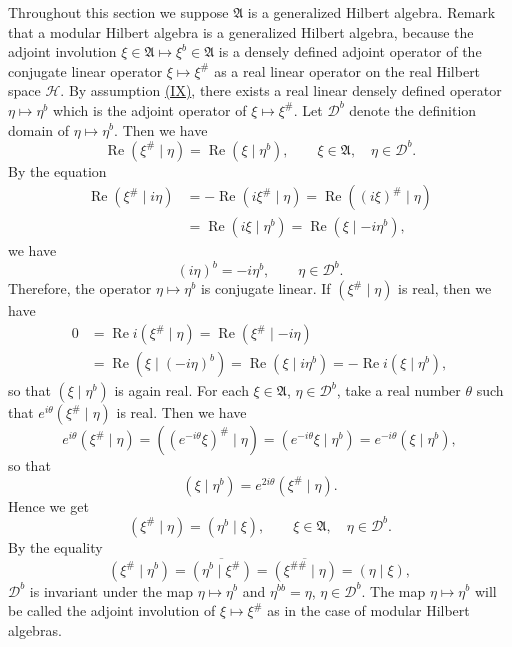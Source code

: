 \documentclass[12pt,b5paper,twoside]{article}
\theoremstyle{takesaki}
\numberwithin{equation}{section}
\newcommand{\modcondref}[1]{\hyperref[cond:2.1:#1]{(#1)}}
\begin{document}
Throughout this section we suppose $\mathfrak A$ is a generalized
Hilbert algebra.  Remark that a modular Hilbert algebra is a generalized
Hilbert algebra, because the adjoint involution
$\xi\in\mathfrak A\mapsto\xi^b\in\mathfrak A$ is a densely defined
adjoint operator of the conjugate linear operator
$\xi\mapsto\xi^\#$ as a real linear operator on the real Hilbert space
$\mathcal H$.  By assumption \modcondref{IX}, there exists a real linear densely
defined operator $\eta\mapsto\eta^b$ which is the adjoint operator of
$\xi\mapsto\xi^\#$.  Let $\mathcal D^b$ denote the definition domain of
$\eta\mapsto\eta^b$.  Then we have
\[
  \operatorname{Re}(\xi^\#\mid\eta)
   =\operatorname{Re}(\xi\mid\eta^b),
  \qquad \xi\in\mathfrak A,\quad\eta\in\mathcal D^b.
\]
By the equation
\begin{align*}
  \operatorname{Re}(\xi^\#\mid i\eta)
    &=-\operatorname{Re}(i\xi^\#\mid\eta)
      =\operatorname{Re}((i\xi)^\#\mid\eta)\\
    &=\operatorname{Re}(i\xi\mid\eta^b)
      =\operatorname{Re}(\xi\mid-i\eta^b),
\end{align*}
we have
\[
  (i\eta)^b=-i\eta^b,\qquad \eta\in\mathcal D^b.
\]
Therefore, the operator $\eta\mapsto\eta^b$ is conjugate linear.  If
$(\xi^\#\mid\eta)$ is real, then we have
\begin{align*}
  0&=\operatorname{Re}i(\xi^\#\mid\eta)
     =\operatorname{Re}(\xi^\#\mid-i\eta)\\
   &=\operatorname{Re}(\xi\mid(-i\eta)^b)
     =\operatorname{Re}(\xi\mid i\eta^b)
     =-\operatorname{Re}i(\xi\mid\eta^b),
\end{align*}
so that $(\xi\mid\eta^b)$ is again real.  For each
$\xi\in\mathfrak A$, $\eta\in\mathcal D^b$, take a real number $\theta$
such that $e^{i\theta}(\xi^\#\mid\eta)$ is real.  Then we have
\[
  e^{i\theta}(\xi^\#\mid\eta)
    =((e^{-i\theta}\xi)^\#\mid\eta)
    =(e^{-i\theta}\xi\mid\eta^b)
    =e^{-i\theta}(\xi\mid\eta^b),
\]
so that
\[
  (\xi\mid\eta^b)=e^{2i\theta}(\xi^\#\mid\eta).
\]
Hence we get
\begin{equation}
  (\xi^\#\mid\eta)=(\eta^b\mid\xi),
  \qquad \xi\in\mathfrak A,\quad\eta\in\mathcal D^b.
  \tag{3.1}\label{eq:3.1}
\end{equation}
By the equality
\[
  (\xi^\#\mid\eta^b)
   =\overline{(\eta^b\mid\xi^\#)}
   =\overline{(\xi^{\#\#}\mid\eta)}
   =(\eta\mid\xi),
\]
$\mathcal D^b$ is invariant under the map $\eta\mapsto\eta^b$ and
$\eta^{bb}=\eta$, $\eta\in\mathcal D^b$.  The map
$\eta\mapsto\eta^b$ will be called the adjoint involution of
$\xi\mapsto\xi^\#$ as in the case of modular Hilbert algebras.
\end{document}
